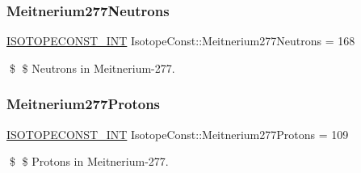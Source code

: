 \subsubsection{\texorpdfstring{Meitnerium277\+Neutrons}{Meitnerium277Neutrons}}
{\footnotesize\ttfamily \mbox{\hyperlink{group___isotope_const-_macros_ga5f18360b3e99483a35c32d789e62621c}{I\+S\+O\+T\+O\+P\+E\+C\+O\+N\+S\+T\+\_\+\+I\+NT}} Isotope\+Const\+::\+Meitnerium277\+Neutrons = 168}

\$ \$ Neutrons in Meitnerium-\/277. \mbox{\label{group___isotope_const-_meitnerium-_mt277_ga14e9500f0b47aef18f8095179adf7988}} 
\subsubsection{\texorpdfstring{Meitnerium277\+Protons}{Meitnerium277Protons}}
{\footnotesize\ttfamily \mbox{\hyperlink{group___isotope_const-_macros_ga5f18360b3e99483a35c32d789e62621c}{I\+S\+O\+T\+O\+P\+E\+C\+O\+N\+S\+T\+\_\+\+I\+NT}} Isotope\+Const\+::\+Meitnerium277\+Protons = 109}

\$ \$ Protons in Meitnerium-\/277. 